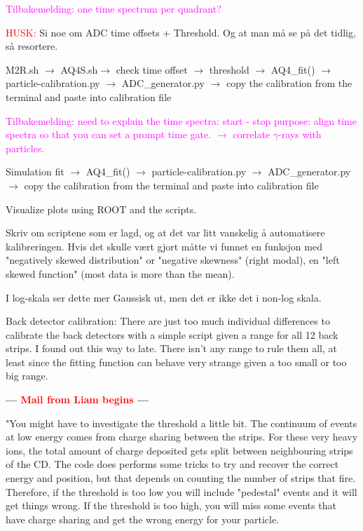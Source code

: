 \documentclass[twoside,english]{uiofysmaster/uiofysmaster}
\begin{document}
\textcolor{Magenta}{Tilbakemelding: \newline 
one time spectrum per quadrant?
}


\textcolor{red}{HUSK:} Si noe om ADC time offsets + Threshold. Og at man må se på det tidlig, så resortere.


M2R.sh $\rightarrow$ AQ4S.sh$\rightarrow$ check time offset $\rightarrow$ threshold $\rightarrow$ AQ4\_fit() $\rightarrow$ particle-calibration.py $\rightarrow$  ADC\_generator.py $\rightarrow$ copy the calibration from the terminal and paste into calibration file 

\textcolor{Magenta}{Tilbakemelding: \newline 
need to explain the time spectra: start - stop \newline
purpose: align time spectra so that you can set a prompt time gate. \newline
$\rightarrow$ correlate $\gamma$-rays with particles.
}


Simulation fit $\rightarrow$ AQ4\_fit() $\rightarrow$ particle-calibration.py $\rightarrow$  ADC\_generator.py $\rightarrow$ copy the calibration from the terminal and paste into calibration file 

Visualize plots using ROOT and the scripts. 



Skriv om scriptene som er lagd, og at det var litt vanskelig å automatisere kalibreringen. Hvis det skulle vært gjort måtte vi funnet en funksjon med "negatively skewed distribution" or "negative skewness" (right modal), en "left skewed function" (most data is more than the mean). 


I log-skala ser dette mer Gaussisk ut, men det er ikke det i non-log skala. 


Back detector calibration: There are just too much individual differences to calibrate the back detectors with a simple script given a range for all 12 back strips. I found out this way to late. There isn't any range to rule them all, at least since the fitting function can behave very strange given a too small or too big range.



\textbf{--- \textcolor{red}{Mail from Liam begins} ---}

"You might have to investigate the threshold a little bit. The continuum of events at low energy comes from charge sharing between the strips. For these very heavy ions, the total amount of charge deposited gets split between neighbouring strips of the CD. The code does performs some tricks to try and recover the correct energy and position, but that depends on counting the number of strips that fire. Therefore, if the threshold is too low you will include "pedestal" events and it will get things wrong. If the threshold is too high, you will miss some events that have charge sharing and get the wrong energy for your particle. 
\end{document}
